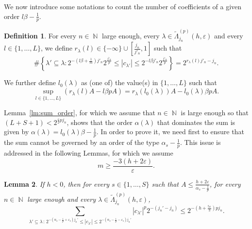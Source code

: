\documentclass[a4paper,11pt,oneside]{article}
\DeclareMathOperator{\N}{\mathbb{N}}
\newcommand{\ccint}[1]{\left[{#1}\right]}
\newcommand{\modu}[1]{\left\vert{#1}\right\vert}
\theoremstyle{definition}
\newtheorem{defi}{Definition}[section]
\theoremstyle{plain}
\newtheorem{lemma}[defi]{Lemma}
\begin{document}
We now introduce some notations to count the number of coefficients of a given order $l\beta-\frac{1}{p}$.

\begin{defi}\label{def:count}
For every $n\in\N$ large enough, every $\lambda\in\widetilde{\Lambda}_{j_n}^{(p)}(h,\varepsilon)$ and every $l\in\{1,\ldots,L\}$, we define $r_\lambda(l)\in\{-\infty\}\cup\ccint{\frac{j_n}{j'_n},1}$ such that
\[
\#\left\{\lambda'\subseteq\lambda:2^{-\left(l\beta+\frac{1}{m}\right)j'_n}2^{\frac{j'_n}{p}}\leq \modu{c_{\lambda'}}\leq 2^{-l\beta j'_n}2^{\frac{j'_n}{p}}\right\}=2^{r_\lambda(l)j'_n-j_n}.
\]

We further define $l_0(\lambda)$ as (one of) the value(s) in $\{1,\ldots,L\}$ such that
\[
\sup_{l\in\{1,\ldots,L\}}\left(r_\lambda(l)A-l\beta pA\right)
=r_\lambda(l_0(\lambda))A-l_0(\lambda)\beta pA.
\]
\end{defi}

Lemma~\ref{lm:sum_order}, for which we assume that $n\in\N$ is large enough so that 
$(L+S+1)<2^{\frac{\varepsilon}{2}pj_n}$, shows that the order $\alpha(\lambda)$ that dominates the sum is given by $\alpha(\lambda)=l_0(\lambda)\beta-\frac{1}{p}$. In order to prove it, we need first to ensure that the sum cannot be governed by an order of the type $\alpha_s-\frac{1}{p}$. This issue is addressed in the following Lemmas, for which we assume
\begin{equation}\label{eq:m_neg}
    m\geq\frac{-3(h+2\varepsilon)}{\varepsilon}.
\end{equation}

\begin{lemma}\label{lm:rid_order1}
    If $h<0$, then for every $s\in\{1,\ldots,S\}$ such that $A\leq\frac{h+2\varepsilon}{\alpha_s-\frac{1}{p}}$, for every $n\in\N$ large enough and every $\lambda\in\widetilde{\Lambda}_{j_n}^{(p)}(h,\varepsilon)$,
    \[
    \sum_{\lambda'\subseteq\lambda \,:\, 2^{-\left(\alpha_s-\frac{1}{p}+\varepsilon_s\right)j_n'} \leq \modu{c_{\lambda'}} \leq 2^{-\left(\alpha_s-\frac{1}{p}-\varepsilon_s\right)j_n'}} \modu{c_{\lambda'}}^p2^{-(j_n'-j_n)} \leq 2^{-\left(h+\frac{5\varepsilon}{3}\right)pj_n}.
    \]
\end{lemma}
\end{document}
